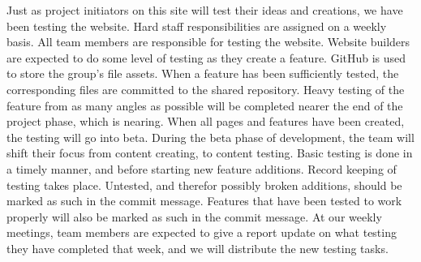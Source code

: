 \documentclass[12pt]{article}
\begin{document}
\begin{enumerate}
Just as project initiators on this site will test their ideas and creations, we have been testing the website. Hard staff responsibilities are assigned on a weekly basis. All team members are responsible for testing the website. Website builders are expected to do some level of testing as they create a feature. GitHub is used to store the group’s file assets. When a feature has been sufficiently tested, the corresponding files are committed to the shared repository. Heavy testing of the feature from as many angles as possible will be completed nearer the end of the project phase, which is nearing. When all pages and features have been created, the testing will go into beta. During the beta phase of development, the team will shift their focus from content creating, to content testing. Basic testing is done in a timely manner, and before starting new feature additions. Record keeping of testing takes place. Untested, and therefor possibly broken additions, should be marked as such in the commit message. Features that have been tested to work properly will also be marked as such in the commit message. At our weekly meetings, team members are expected to give a report update on what testing they have completed that week, and we will distribute the new testing tasks.

\end{enumerate}
\end{document}
